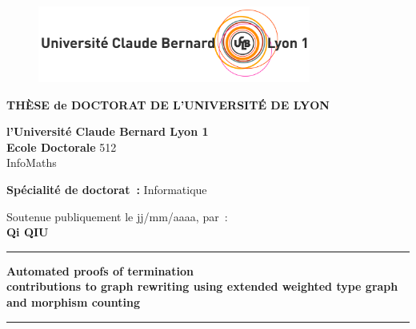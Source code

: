 
\begin{titlepage}

    \unitlength 1cm
    \begin{center}
    
    \vspace*{-2.5cm}
    \begin{figure}[h]
        \centering
        \includegraphics[width=0.8\textwidth]{LogoLyon1Off_CoulCmjn300dpi.jpg}
    \end{figure}
    
               {\large\bf THÈSE de DOCTORAT DE L'UNIVERSITÉ DE LYON\\}
   
               {\large \bf l'Université Claude Bernard Lyon 1\\}
    \vspace{12pt}
               {\large \textbf{Ecole Doctorale} 512 \\InfoMaths}

    \vspace{12pt}
    
               {\large \textbf{Spécialité de doctorat~:} Informatique \\}
    
    \vspace{0.8cm}
    
               {Soutenue publiquement le jj/mm/aaaa, par~:\\}
               {\Large\bf {Qi QIU}}
    \vspace{0.5cm}           
    
    
    \rule{5cm}{1pt}
    
    \vspace{12pt}
               
               {\LARGE \bf Automated proofs of termination}\\
               \vspace{0.3cm}
               {\Large \bf contributions to graph rewriting using extended weighted type graph and morphism counting }
               
    \vspace{12pt}
    \rule{5cm}{1pt}
    

\end{center}
\end{titlepage}
